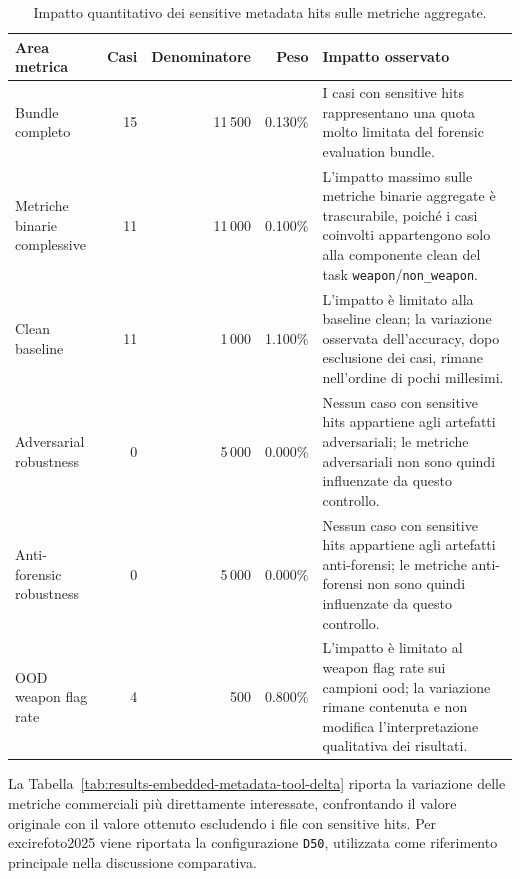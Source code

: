 \begin{table}[H]
\centering
\scriptsize
\renewcommand{\arraystretch}{1.15}
\setlength{\tabcolsep}{4pt}
\caption{Impatto quantitativo dei sensitive metadata hits sulle metriche aggregate.}
\label{tab:results-embedded-metadata-impact}
\begin{tabularx}{\textwidth}{@{}p{} r r r X@{}}
\toprule
\textbf{Area metrica} &
\textbf{Casi} &
\textbf{Denominatore} &
\textbf{Peso} &
\textbf{Impatto osservato} \\
\midrule

Bundle completo &
15 &
11\,500 &
0.130\% &
I casi con sensitive hits rappresentano una quota molto limitata del forensic
evaluation bundle. \\

Metriche binarie complessive &
11 &
11\,000 &
0.100\% &
L'impatto massimo sulle metriche binarie aggregate è trascurabile, poiché i casi
coinvolti appartengono solo alla componente clean del task
\texttt{weapon}/\texttt{non\_weapon}. \\

Clean baseline &
11 &
1\,000 &
1.100\% &
L'impatto è limitato alla baseline clean; la variazione osservata
dell'accuracy, dopo esclusione dei casi, rimane nell'ordine di pochi millesimi. \\

Adversarial robustness &
0 &
5\,000 &
0.000\% &
Nessun caso con sensitive hits appartiene agli artefatti adversariali; le
metriche adversariali non sono quindi influenzate da questo controllo. \\

Anti-forensic robustness &
0 &
5\,000 &
0.000\% &
Nessun caso con sensitive hits appartiene agli artefatti anti-forensi; le
metriche anti-forensi non sono quindi influenzate da questo controllo. \\

OOD weapon flag rate &
4 &
500 &
0.800\% &
L'impatto è limitato al weapon flag rate sui campioni \gls{ood}; la variazione
rimane contenuta e non modifica l'interpretazione qualitativa dei risultati. \\

\bottomrule
\end{tabularx}
\end{table}




La Tabella~\ref{tab:results-embedded-metadata-tool-delta} riporta la variazione
delle metriche commerciali più direttamente interessate, confrontando il valore
originale con il valore ottenuto escludendo i file con sensitive hits. Per
\gls{excirefoto2025} viene riportata la configurazione \texttt{D50}, utilizzata
come riferimento principale nella discussione comparativa.



